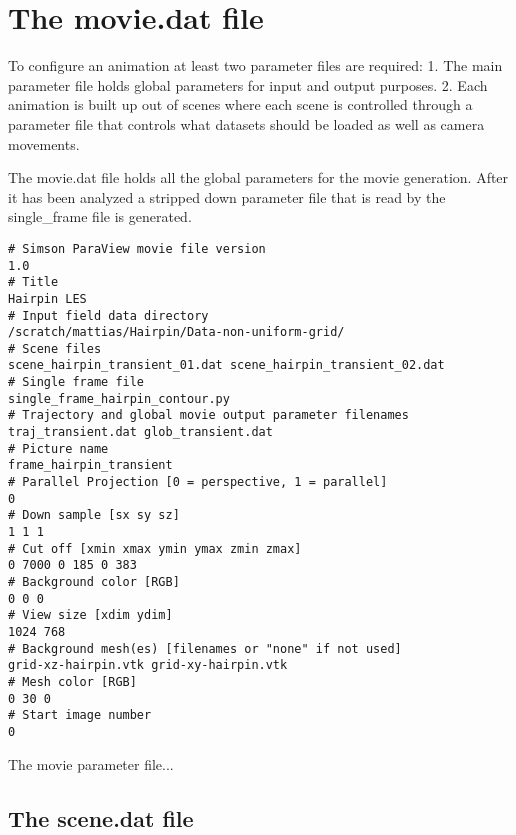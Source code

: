 \documentclass[10pt,a4paper]{simson}
\begin{document}
\section{The movie.dat file}
To configure an animation at least two parameter files are required:
1. The main parameter file holds global parameters for input and
output purposes.
2. Each animation is built up out of scenes where each scene
is controlled through a parameter file that controls what datasets
should be loaded as well as camera movements.

The movie.dat file holds all the global parameters for the movie
generation. After it has been analyzed a stripped down parameter file
that is read by the single\_frame file is generated.

\begin{table}
\begin{verbatim}
# Simson ParaView movie file version
1.0
# Title
Hairpin LES
# Input field data directory
/scratch/mattias/Hairpin/Data-non-uniform-grid/
# Scene files
scene_hairpin_transient_01.dat scene_hairpin_transient_02.dat
# Single frame file
single_frame_hairpin_contour.py
# Trajectory and global movie output parameter filenames
traj_transient.dat glob_transient.dat
# Picture name
frame_hairpin_transient
# Parallel Projection [0 = perspective, 1 = parallel]
0
# Down sample [sx sy sz]
1 1 1
# Cut off [xmin xmax ymin ymax zmin zmax]
0 7000 0 185 0 383
# Background color [RGB]
0 0 0
# View size [xdim ydim]
1024 768
# Background mesh(es) [filenames or "none" if not used]
grid-xz-hairpin.vtk grid-xy-hairpin.vtk
# Mesh color [RGB]
0 30 0
# Start image number
0
\end{verbatim}
\caption{The movie parameter file...}
\end{table}


\subsection{The scene.dat file}

\begin{verbatim}

\end{verbatim}

\end{document}
